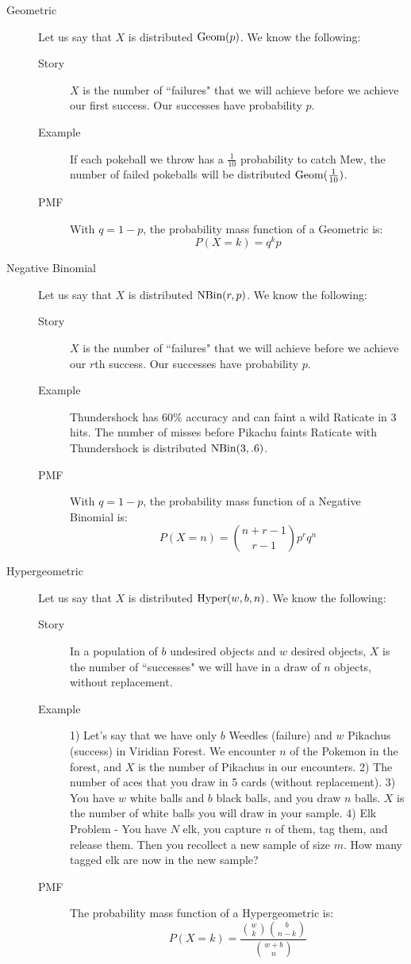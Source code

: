 \documentclass[11pt]{article}
\begin{document}
\begin{description}
\item[Geometric] Let us say that $X$ is distributed $\textrm{Geom}(p)$. We know the following:
\begin{description}
  \item[Story] $X$ is the number of ``failures" that we will achieve before we achieve our first success. Our successes have probability $p$.
  \item[Example] If each pokeball we throw has a $\frac{1}{10}$ probability to catch Mew, the number of failed pokeballs will be distributed $\textrm{Geom}(\frac{1}{10})$.
  \item[PMF] With $q = 1-p$, the probability mass function of a Geometric is:
\[P(X = k) = q^kp\]
\end{description}

\item[Negative Binomial] Let us say that $X$ is distributed $\textrm{NBin}(r, p)$. We know the following:
\begin{description}
  \item[Story] $X$ is the number of ``failures" that we will achieve before we achieve our $r$th success. Our successes have probability $p$.
  \item[Example] Thundershock has 60\% accuracy and can faint a wild Raticate in 3 hits. The number of misses before Pikachu faints Raticate with Thundershock is distributed $\textrm{NBin}(3, .6)$.
  \item[PMF] With $q = 1-p$, the probability mass function of a Negative Binomial is:
\[P(X = n) = {n+r - 1 \choose r -1}p^rq^n\]
\end{description}

\item[Hypergeometric] Let us say that $X$ is distributed $\textrm{Hyper}(w, b, n)$. We know the following:
\begin{description}
  \item[Story] In a population of $b$ undesired objects and $w$ desired objects, $X$ is the number of ``successes" we will have in a draw of $n$ objects, without replacement.
  \item[Example] 1) Let's say that we have only $b$ Weedles (failure) and $w$ Pikachus (success) in Viridian Forest. We encounter $n$ of the Pokemon in the forest, and $X$ is the number of Pikachus in our encounters. 2) The number of aces that you draw in 5 cards (without replacement). 3) You have $w$ white balls and $b$ black balls, and you draw $n$ balls. $X$ is the number of white balls you will draw in your sample. 4) Elk Problem - You have $N$ elk, you capture $n$ of them, tag them, and release them. Then you recollect a new sample of size $m$. How many tagged elk are now in the new sample?
  \item[PMF] The probability mass function of a Hypergeometric is:
\[P(X = k) = \frac{{w \choose k}{b \choose n-k}}{{w + b \choose n}}\]
\end{description}



\end{description}
\end{document}
